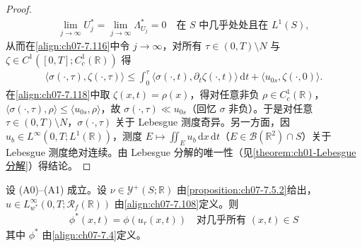 \documentclass[../../main.tex]{subfiles}%
\begin{document}
\begin{proof}
\begin{align}
\lim_{j\to\infty}U_j^*=\lim_{j\to\infty}\Lambda_{U_j}^*=0\quad\text{在 }S\text{ 中几乎处处且在 }L^1(S), \label{align:ch07-7.117}
\end{align}
从而在\eqref{align:ch07-7.116}中令 $j\to\infty$，对所有 $\tau\in(0,T)\setminus N$ 与 $\zeta\in C^1([0,T];C^1_c(\mathbb{R}))$ 得
\begin{align}
\langle\sigma(\cdot,\tau),\zeta(\cdot,\tau)\rangle
\leqslant\int_0^\tau\langle\sigma(\cdot,t),\partial_t\zeta(\cdot,t)\rangle\,\mathrm{d}t+\langle u_{0s},\zeta(\cdot,0)\rangle. \label{align:ch07-7.118}
\end{align}
在\eqref{align:ch07-7.118}中取 $\zeta(x,t)=\rho(x)$，得对任意非负 $\rho\in C^1_c(\mathbb{R})$，$\langle\sigma(\cdot,\tau),\rho\rangle\leqslant\langle u_{0s},\rho\rangle$，故 $\sigma(\cdot,\tau)\ll u_{0s}$（回忆 $\sigma$ 非负）。于是对任意 $\tau\in(0,T)\setminus N$，$\sigma(\cdot,\tau)$ 关于 Lebesgue 测度奇异。另一方面，因 $u_b\in L^\infty(0,T;L^1(\mathbb{R}))$，测度 $E\mapsto\iint_E u_b\,\mathrm{d}x\,\mathrm{d}t$（$E\in\mathcal{B}(\mathbb{R}^2)\cap S$）关于 Lebesgue 测度绝对连续。由 Lebesgue 分解的唯一性（见\cref{theorem:ch01-Lebesgue分解}）得结论。
\end{proof}

\begin{proposition}\label{proposition:ch07-divcurl}\label{proposition:ch07-7.5.6}
设 (A0)--(A1) 成立。设 $\nu\in\mathcal{Y}^+(S;\mathbb{R})$ 由\cref{proposition:ch07-7.5.2}给出，$u\in L^\infty_{w^*}(0,T;\mathscr{R}_f(\mathbb{R}))$ 由\eqref{align:ch07-7.108}定义。则
\begin{align}
\phi^*(x,t)=\phi(u_r(x,t))\quad\text{对几乎所有 }(x,t)\in S \label{align:ch07-7.119}
\end{align}
其中 $\phi^*$ 由\eqref{align:ch07-7.4}定义。
\end{proposition}
\end{document}
